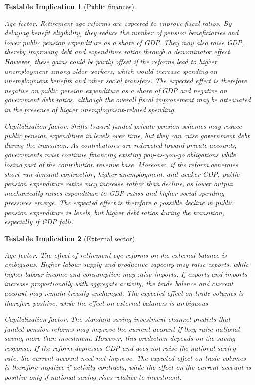 \documentclass[11pt,english,a4paper, twoside, authoryear]{article}
\newtheorem{testable}{Testable Implication}}
\begin{document}
\begin{testable}[Public finances]\label{test:public_finances}

    
\emph{Age factor.} Retirement-age reforms are expected to improve fiscal ratios. By delaying benefit eligibility, they reduce the number of pension beneficiaries and lower public pension expenditure as a share of GDP. They may also raise GDP, thereby improving debt and expenditure ratios through a denominator effect. However, these gains could be partly offset if the reforms lead to higher unemployment among older workers, which would increase spending on unemployment benefits and other social transfers. The expected effect is therefore negative on public pension expenditure as a share of GDP and negative on government debt ratios, although the overall fiscal improvement may be attenuated in the presence of higher unemployment-related spending.

\emph{Capitalization factor.} Shifts toward funded private pension schemes may reduce public pension expenditure in levels over time, but they can raise government debt during the transition. As contributions are redirected toward private accounts, governments must continue financing existing pay-as-you-go obligations while losing part of the contribution revenue base. Moreover, if the reform generates short-run demand contraction, higher unemployment, and weaker GDP, public pension expenditure ratios may increase rather than decline, as lower output mechanically raises expenditure-to-GDP ratios and higher social spending pressures emerge. The expected effect is therefore a possible decline in public pension expenditure in levels, but higher debt ratios during the transition, especially if GDP falls.
 
\end{testable}

\begin{testable}[External sector]\label{test:external}

\emph{Age factor.} The effect of retirement-age reforms on the external balance is ambiguous. Higher labour supply and productive capacity may raise exports, while higher labour income and consumption may raise imports. If exports and imports increase proportionally with aggregate activity, the trade balance and current account may remain broadly unchanged. The expected effect on trade volumes is therefore positive, while the effect on external balances is ambiguous.

\emph{Capitalization factor.} The standard saving-investment channel predicts that funded pension reforms may improve the current account if they raise national saving more than investment. However, this prediction depends on the saving response. If the reform depresses GDP and does not raise the national saving rate, the current account need not improve. The expected effect on trade volumes is therefore negative if activity contracts, while the effect on the current account is positive only if national saving rises relative to investment.
\end{testable}
\end{document}
